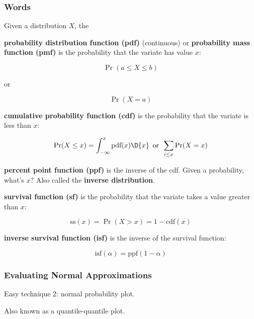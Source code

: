 \begin{frame}
  \frametitle{Words}

  Given a distribution $X$, the

   {
    \textbf{probability distribution function (pdf)} (continuous) or
    \textbf{probability mass function (pmf)} is the probability that
    the variate has value $x$:
    
    \begin{displaymath}
      \Pr(a\le X \le b)
    \end{displaymath}
    \centerline{or}
    \begin{displaymath}
      \Pr(X=a)
    \end{displaymath}
  }
  
   {
    \textbf{cumulative probability function (cdf)} is the probability
    that the variate is less than $x$:

    \begin{displaymath}
      \Pr(X\le x) = \int_{-\infty}^x \text{pdf}(x) \D{x} \,\text{ or }\, \sum_{i\le x} \Pr(X = x)
    \end{displaymath}
  }
  
   {
    \textbf{percent point function (ppf)} is the inverse of the cdf.
    Given a probability, what's $x$?
    Also called the \textbf{inverse distribution}.
  }
  
   {
    \textbf{survival function (sf)} is the probability that the
    variate takes a value greater than $x$:

    \begin{displaymath}
      \text{ss}(x) = \Pr(X > x) = 1-\text{cdf}(x)
    \end{displaymath}
  }
  
   {
    \textbf{inverse survival function (isf)} is the inverse of the
    survival function:

    \begin{displaymath}
      \text{isf}(\alpha) = \text{ppf}(1-\alpha)
    \end{displaymath}
  }
\end{frame}

\begin{frame}
\end{frame}

\begin{frame}
  \frametitle{Evaluating Normal Approximations}


   {Easy technique 2: normal probability plot.


    Also known as a quantile-quantile plot.
  }
\end{frame}

